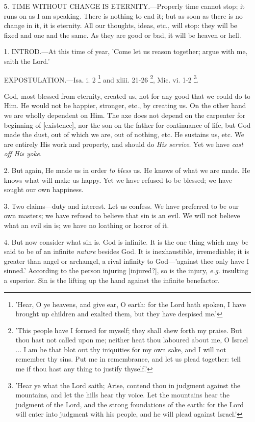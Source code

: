 5. TIME WITHOUT
CHANGE IS
ETERNITY.—Properly time cannot
stop; it runs on as I am speaking. There is nothing to end it; but as
soon as there is no change in it, it is eternity. All our thoughts,
ideas, etc., will stop: they will be fixed and one and the same. As
they are good or bad, it will be heaven or hell.


1. INTROD.—At
this time of year, 'Come let us reason together; argue with me, saith
the Lord.'

EXPOSTULATION.—Isa.
i. 2 \footnote{'Hear, O ye heavens, and
give ear, O earth: for the Lord hath spoken, I have brought up
children and exalted them, but they have despised me.'} and xliii. 21-26
\footnote{'This people have I
formed for myself; they shall shew forth my praise. But thou hast not
called upon me; neither heat thou laboured about me, O Israel ... I am
he that blot out thy iniquities for my own sake, and I will not
remember thy sins. Put me in remembrance, and let us plead together:
tell me if thou hast any thing to justify thyself.'}, Mic. vi. 1-2 \footnote{'Hear ye what the Lord
saith; Arise, contend thou in judgment against the mountains, and let
the hills hear thy voice. Let the mountains hear the judgment of the
Lord, and the strong foundations of the earth: for the Lord will enter
into judgment with his people, and he will plead against Israel.'}.

God, most blessed from eternity, created us, not
for any good that we could do to Him. He would not be happier,
stronger, etc., by creating us. On the other hand we are wholly
dependent on Him. The axe does not depend on the carpenter for
beginning of [existence], nor the son on the father for continuance of
life, but God made the dust, out of which we are, out of nothing, etc.
He sustains us, etc. We are entirely His work and property, and should
do \emph{His service}. Yet we have \emph{cast off His yoke}.

2. But again, He made us in order \emph{to bless}
us. He knows of what we are made. He knows what will make us happy.
Yet we have refused to be blessed; we have sought our own happiness.

3. Two claims—duty and interest. Let us
confess. We have preferred to be our own masters; we have refused to
believe that sin is an evil. We will not believe what an evil sin is;
we have no loathing or horror of it.

4. But now consider what sin is. God is infinite.
It is the one thing which may be said to be of an infinite \emph{nature}
besides God. It is inexhaustible, irremediable; it is greater than
angel or archangel, a rival infinity to God—'against thee only have
I sinned.' According to the person injuring [injured?], so is the
injury, \emph{e.g}. insulting a superior. Sin is the lifting up the
hand against the infinite benefactor.

